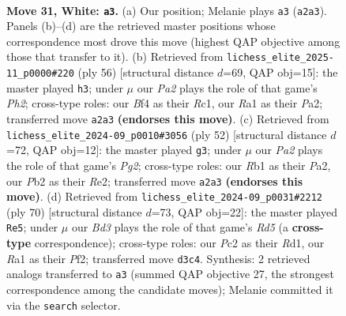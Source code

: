 \documentclass[11pt]{article}
\begin{document}
\clearpage

\begin{figure}[p]\centering
\begin{subfigure}{0.46\textwidth}\centering
\resizebox{\linewidth}{!}{%
\newchessgame
\chessboard[
  setfen={2r3nr/p4k1p/2p5/b7/5B2/3B3P/PPP2KP1/RR6 w - - 1 31},
  showmover=false,
  pgfstyle=straightmove, color=movearrow, markmove={a2-a3}
]}
\caption{}
\end{subfigure}\hfill
\begin{subfigure}{0.46\textwidth}\centering
\resizebox{\linewidth}{!}{%
\newchessgame
\chessboard[
  setfen={4r1k1/8/bp5p/p2r1pp1/8/2B5/PPP2RPP/2R3K1 w - - 0 29},
  showmover=false,
  pgfstyle=straightmove, color=movearrow, markmove={h2-h3}
]}
\caption{}
\end{subfigure}
\\[4pt]
\begin{subfigure}{0.46\textwidth}\centering
\resizebox{\linewidth}{!}{%
\newchessgame
\chessboard[
  setfen={1r6/2p3p1/p1knr2p/4p3/2P5/4B3/P3RPPP/2R3K1 w - - 1 27},
  showmover=false,
  pgfstyle=straightmove, color=movearrow, markmove={g2-g3}
]}
\caption{}
\end{subfigure}\hfill
\begin{subfigure}{0.46\textwidth}\centering
\resizebox{\linewidth}{!}{%
\newchessgame
\chessboard[
  setfen={5rk1/p3r1n1/8/3R3p/2N4P/1P3pP1/1P3P2/3R2K1 w - - 3 36},
  showmover=false,
  pgfstyle=straightmove, color=movearrow, markmove={d5-e5}
]}
\caption{}
\end{subfigure}
\caption{\textbf{Move 31, White: \texttt{a3}.} (a) Our position; Melanie plays \texttt{a3} (\texttt{a2a3}). Panels (b)--(d) are the retrieved master positions whose correspondence most drove this move (highest QAP objective among those that transfer to it). (b) Retrieved from \texttt{lichess\_elite\_2025-11\_p0000\#220} (ply 56) [structural distance $d$=69, QAP obj=15]: the master played \texttt{h3}; under $\mu$ our \emph{Pa2} plays the role of that game's \emph{Ph2}; cross-type roles: our \emph{B}f4 as their \emph{R}c1, our \emph{R}a1 as their \emph{P}a2; transferred move \texttt{a2a3} \textbf{(endorses this move)}. (c) Retrieved from \texttt{lichess\_elite\_2024-09\_p0010\#3056} (ply 52) [structural distance $d$=72, QAP obj=12]: the master played \texttt{g3}; under $\mu$ our \emph{Pa2} plays the role of that game's \emph{Pg2}; cross-type roles: our \emph{R}b1 as their \emph{P}a2, our \emph{P}b2 as their \emph{R}e2; transferred move \texttt{a2a3} \textbf{(endorses this move)}. (d) Retrieved from \texttt{lichess\_elite\_2024-09\_p0031\#2212} (ply 70) [structural distance $d$=73, QAP obj=22]: the master played \texttt{Re5}; under $\mu$ our \emph{Bd3} plays the role of that game's \emph{Rd5} (a \textbf{cross-type} correspondence); cross-type roles: our \emph{P}c2 as their \emph{R}d1, our \emph{R}a1 as their \emph{P}f2; transferred move \texttt{d3c4}. Synthesis: 2 retrieved analogs transferred to \texttt{a3} (summed QAP objective 27, the strongest correspondence among the candidate moves); Melanie committed it via the \texttt{search} selector.}
\label{fig:thought-m60}
\end{figure}
\end{document}
